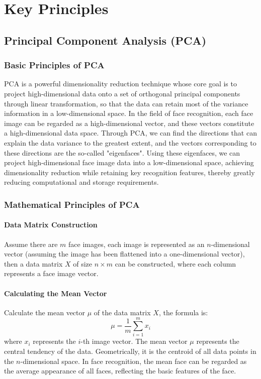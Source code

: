 \documentclass{article}
\begin{document}
\section{Key Principles}

\subsection{Principal Component Analysis (PCA)}

\subsubsection{Basic Principles of PCA}
PCA is a powerful dimensionality reduction technique whose core goal is to project high-dimensional data onto a set of orthogonal principal components through linear transformation, so that the data can retain most of the variance information in a low-dimensional space. In the field of face recognition, each face image can be regarded as a high-dimensional vector, and these vectors constitute a high-dimensional data space. Through PCA, we can find the directions that can explain the data variance to the greatest extent, and the vectors corresponding to these directions are the so-called "eigenfaces". Using these eigenfaces, we can project high-dimensional face image data into a low-dimensional space, achieving dimensionality reduction while retaining key recognition features, thereby greatly reducing computational and storage requirements.

\subsubsection{Mathematical Principles of PCA}

\paragraph{Data Matrix Construction}
Assume there are \( m \) face images, each image is represented as an \( n \)-dimensional vector (assuming the image has been flattened into a one-dimensional vector), then a data matrix \( X \) of size \( n \times m \) can be constructed, where each column represents a face image vector.

\paragraph{Calculating the Mean Vector}
Calculate the mean vector \( \mu \) of the data matrix \( X \), the formula is:
\[
\mu = \frac{1}{m} \sum_{i=1}^{m} x_i
\]
where \( x_i \) represents the \( i \)-th image vector. The mean vector \( \mu \) represents the central tendency of the data. Geometrically, it is the centroid of all data points in the \( n \)-dimensional space. In face recognition, the mean face can be regarded as the average appearance of all faces, reflecting the basic features of the face.
\end{document}
